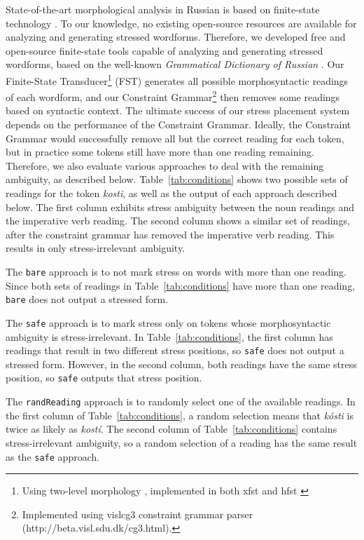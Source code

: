 \documentclass[11pt]{article}
\newcommand{\rr}[1]{\marginpar{\scriptsize R: #1}} %
\begin{document}
State-of-the-art morphological analysis in Russian is based on finite-state
technology \cite{Nozhov-03,Segalovich-03}. To our knowledge, no existing 
open-source resources are available for analyzing and generating 
stressed wordforms. Therefore, we developed free and open-source finite-state 
tools capable of analyzing and generating stressed wordforms, based on the
well-known \emph{Grammatical Dictionary of Russian} \cite{Zaliznjak-77}.
Our Finite-State Transducer\footnote{Using two-level 
morphology \cite{Koskenniemi-83,Koskenniemi-84}, implemented in both xfst
\cite{Beesley.Karttunen-03} and hfst \cite{Linden.Silfverberg.ea-11}} (FST) generates all possible 
morphosyntactic readings of each wordform, and our Constraint 
Grammar\footnote{Implemented using vislcg3 constraint grammar parser
(http://beta.visl.sdu.dk/cg3.html).}
\cite{Karlsson-90,Karlsson.Voutilainen.ea-95} then removes
some readings based on syntactic context. The ultimate success of our 
stress placement system depends on the performance of the Constraint Grammar. 
Ideally, the Constraint Grammar would successfully remove all but the correct 
reading for each token, but in practice some
tokens still have more than one reading remaining. Therefore,
we also evaluate various approaches to deal with the remaining ambiguity,
as described below. Table~\ref{tab:conditions} shows two possible sets of readings
for the token \emph{kosti}, as well as the output of each approach described below.
The first column exhibits stress ambiguity between the noun readings and the imperative
verb reading. The second column shows a similar set of readings, after the
constraint grammar has removed the imperative verb reading. This results in only
stress-irrelevant ambiguity.

\rr{more about our corpus}
The {\small {\tt bare}} approach is to not mark stress on words with more than 
one reading. Since both sets of readings in Table~\ref{tab:conditions} have more
than one reading, {\small {\tt bare}} does not output a stressed form. 

The {\small {\tt safe}} approach is to mark stress only on
tokens whose morphosyntactic ambiguity is stress-irrelevant. In 
Table~\ref{tab:conditions}, the first column has readings that result in two
different stress positions, so {\small {\tt safe}} does not output a stressed
form. However, in the second column, both readings have the same stress position, 
so {\small {\tt safe}} outputs that stress position.

The {\small {\tt randReading}} approach is to randomly select one of the available 
readings. In the first column of
Table~\ref{tab:conditions}, a random selection means that \emph{kósti} 
is twice as likely as \emph{kostí}. The
second column of Table~\ref{tab:conditions} contains stress-irrelevant
ambiguity, so a random selection of a reading has the same result as the
{\small {\tt safe}} approach.
\end{document}
